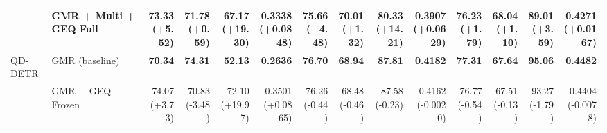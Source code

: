 \documentclass{article}
\begin{document}
{\begin{tabular}{llrrrrrrrrrrrr}
 & GMR + Multi + GEQ Full & \shortstack{73.33 \\ {\scriptsize\textcolor{Gain}{(+5.52)}}} & \shortstack{71.78 \\ {\scriptsize\textcolor{Gain}{(+0.59)}}} & \shortstack{67.17 \\ {\scriptsize\textcolor{Gain}{(+19.30)}}} & \shortstack{0.3338 \\ {\scriptsize\textcolor{Gain}{(+0.0848)}}} & \shortstack{75.66 \\ {\scriptsize\textcolor{Gain}{(+4.48)}}} & \shortstack{70.01 \\ {\scriptsize\textcolor{Gain}{(+1.32)}}} & \shortstack{80.33 \\ {\scriptsize\textcolor{Gain}{(+14.21)}}} & \shortstack{0.3907 \\ {\scriptsize\textcolor{Gain}{(+0.0629)}}} & \shortstack{76.23 \\ {\scriptsize\textcolor{Gain}{(+1.79)}}} & \shortstack{68.04 \\ {\scriptsize\textcolor{Gain}{(+1.10)}}} & \shortstack{89.01 \\ {\scriptsize\textcolor{Gain}{(+3.59)}}} & \shortstack{0.4271 \\ {\scriptsize\textcolor{Gain}{(+0.0167)}}} \\
\midrule
QD-DETR & GMR (baseline) & \textbf{70.34} & \textbf{74.31} & \textbf{52.13} & \textbf{0.2636} & \textbf{76.70} & \textbf{68.94} & \textbf{87.81} & \textbf{0.4182} & \textbf{77.31} & \textbf{67.64} & \textbf{95.06} & \textbf{0.4482} \\
 & GMR + GEQ Frozen & \shortstack{74.07 \\ {\scriptsize\textcolor{Gain}{(+3.73)}}} & \shortstack{70.83 \\ {\scriptsize\textcolor{Loss}{(-3.48)}}} & \shortstack{72.10 \\ {\scriptsize\textcolor{Gain}{(+19.97)}}} & \shortstack{0.3501 \\ {\scriptsize\textcolor{Gain}{(+0.0865)}}} & \shortstack{76.26 \\ {\scriptsize\textcolor{Loss}{(-0.44)}}} & \shortstack{68.48 \\ {\scriptsize\textcolor{Loss}{(-0.46)}}} & \shortstack{87.58 \\ {\scriptsize\textcolor{Loss}{(-0.23)}}} & \shortstack{0.4162 \\ {\scriptsize\textcolor{Loss}{(-0.0020)}}} & \shortstack{76.77 \\ {\scriptsize\textcolor{Loss}{(-0.54)}}} & \shortstack{67.51 \\ {\scriptsize\textcolor{Loss}{(-0.13)}}} & \shortstack{93.27 \\ {\scriptsize\textcolor{Loss}{(-1.79)}}} & \shortstack{0.4404 \\ {\scriptsize\textcolor{Loss}{(-0.0078)}}} \\

\end{tabular}}
\end{document}
